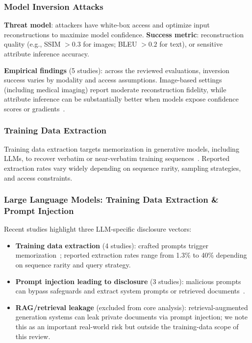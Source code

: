 \documentclass[conference]{IEEEtran}
\begin{document}
\subsubsection{Model Inversion Attacks}
\textbf{Threat model}: attackers have white-box access and optimize input reconstructions to maximize model confidence. \textbf{Success metric}: reconstruction quality (e.g., SSIM $>0.3$ for images; BLEU $>0.2$ for text), or sensitive attribute inference accuracy.

\textbf{Empirical findings} (5 studies): across the reviewed evaluations, inversion success varies by modality and access assumptions. Image-based settings (including medical imaging) report moderate reconstruction fidelity, while attribute inference can be substantially better when models expose confidence scores or gradients~\cite{fredrikson2015model}.

\subsubsection{Training Data Extraction}
Training data extraction targets memorization in generative models, including LLMs, to recover verbatim or near-verbatim training sequences~\cite{carlini2021extracting}. Reported extraction rates vary widely depending on sequence rarity, sampling strategies, and access constraints.

\subsubsection{Large Language Models: Training Data Extraction \& Prompt Injection}
Recent studies highlight three LLM-specific disclosure vectors:
\begin{itemize}
  \item \textbf{Training data extraction} (4 studies): crafted prompts trigger memorization~\cite{carlini2021extracting,huang2024training}; reported extraction rates range from 1.3\% to 40\% depending on sequence rarity and query strategy.
  \item \textbf{Prompt injection leading to disclosure} (3 studies): malicious prompts can bypass safeguards and extract system prompts or retrieved documents~\cite{zhu2023prompt,owasp_llm01}.
  \item \textbf{RAG/retrieval leakage} (excluded from core analysis): retrieval-augmented generation systems can leak private documents via prompt injection; we note this as an important real-world risk but outside the training-data scope of this review.
\end{itemize}
\end{document}
